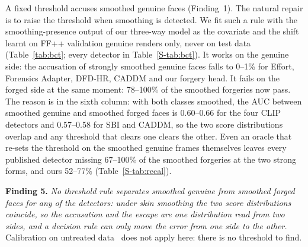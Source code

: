 \documentclass[conference]{IEEEtran}
\begin{document}
A fixed threshold accuses smoothed genuine faces (Finding~1). The natural repair is to raise the threshold when smoothing is
detected. We fit such a rule with the smoothing-presence output of our three-way model as the covariate and the shift learnt
on FF++ validation genuine renders only, never on test data (Table~\ref{tab:bct}; every detector in Table~\ref{S-tab:bct}). It works on the genuine side: the
accusation of strongly smoothed genuine faces falls to 0--1\% for Effort, Forensics Adapter, DFD-HR, CADDM and our forgery
head.
It fails on the forged side at the same moment: 78--100\% of the smoothed forgeries now pass.
The reason is in the sixth column: with both classes smoothed, the AUC between smoothed genuine and smoothed forged faces is
0.60--0.66 for the four CLIP detectors and 0.57--0.58 for SBI and CADDM, so the two score distributions overlap and any
threshold that clears one clears the other.
Even an oracle that re-sets the threshold on the smoothed genuine frames themselves leaves every published detector
missing 67--100\% of the smoothed forgeries at the two strong forms, and ours 52--77\% (Table~\ref{S-tab:recal}).

\textbf{Finding 5.} \emph{No threshold rule separates smoothed genuine from smoothed forged faces for any of the
detectors: under skin smoothing the two score distributions coincide, so the accusation and the escape are one distribution
read from two sides, and a decision rule can only move the error from one side to the other.} Calibration on untreated data~\cite{laionmobile2026} does not apply here: there is no threshold to find.
\end{document}
